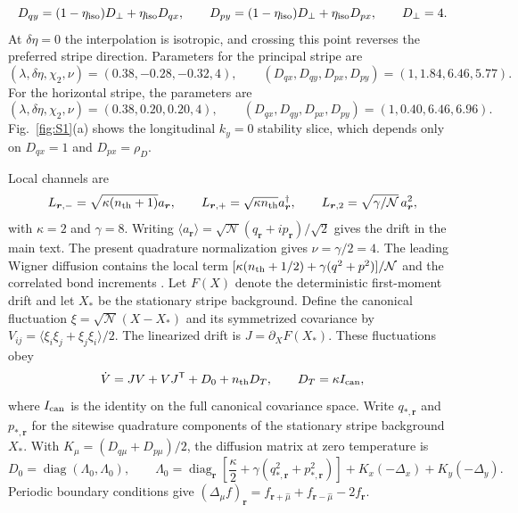\documentclass[aps,prl,twocolumn,superscriptaddress,nofootinbib,floatfix]{revtex4-2}
\newcommand{\cN}{\mathcal N}
\begin{document}
\begin{equation}
 D_{qy}=(1-\eta_{\rm iso})D_\perp+\eta_{\rm iso}D_{qx},
 \qquad
 D_{py}=(1-\eta_{\rm iso})D_\perp+\eta_{\rm iso}D_{px},
 \qquad D_\perp=4.
 \label{eq:transportMapS}
\end{equation}
At $\delta\eta=0$ the interpolation is isotropic, and crossing this point reverses the preferred stripe direction. Parameters for the principal stripe are
\[
 (\lambda,\delta\eta,\chi_2,\nu)=(0.38,-0.28,-0.32,4),
 \qquad (D_{qx},D_{qy},D_{px},D_{py})=(1,1.84,6.46,5.77).
\]
For the horizontal stripe, the parameters are
\[
 (\lambda,\delta\eta,\chi_2,\nu)=(0.38,0.20,0.20,4),
 \qquad (D_{qx},D_{qy},D_{px},D_{py})=(1,0.40,6.46,6.96).
\]
Fig.~\ref{fig:S1}(a) shows the longitudinal $k_y=0$ stability slice, which depends only on $D_{qx}=1$ and $D_{px}=\rho_D$.

Local channels are
\begin{equation}
 L_{\bm r,-}=\sqrt{\kappa(n_{\rm th}+1)}a_{\bm r},
 \qquad
 L_{\bm r,+}=\sqrt{\kappa n_{\rm th}}a_{\bm r}^\dagger,
 \qquad
 L_{\bm r,2}=\sqrt{\gamma/\cN}\,a_{\bm r}^2,
 \label{eq:localjumpsS}
\end{equation}
with $\kappa=2$ and $\gamma=8$. Writing $\langle a_{\bm r}\rangle=\sqrt{\cN}(q_{\bm r}+ip_{\bm r})/\sqrt2$ gives the drift in the main text. The present quadrature normalization gives $\nu=\gamma/2=4$. The leading Wigner diffusion contains the local term $[\kappa(n_{\rm th}+1/2)+\gamma(q^2+p^2)]/\cN$ and the correlated bond increments \cite{GardinerZoller2004,VanKampen2007}. Let $F(X)$ denote the deterministic first-moment drift and let $X_*$ be the stationary stripe background. Define the canonical fluctuation $\xi=\sqrt{\cN}(X-X_*)$ and its symmetrized covariance by $V_{ij}=\langle\xi_i\xi_j+\xi_j\xi_i\rangle/2$. The linearized drift is $J=\partial_XF(X_*)$. These fluctuations obey
\begin{equation}
 \dot V=JV+VJ^{\mathsf T}+D_0+n_{\rm th}D_T,
 \qquad D_T=\kappa I_{\rm can},
 \label{eq:LyapunovS}
\end{equation}
where $I_{\rm can}$ is the identity on the full canonical covariance space. Write $q_{*,\bm r}$ and $p_{*,\bm r}$ for the sitewise quadrature components of the stationary stripe background $X_*$. With $K_\mu=(D_{q\mu}+D_{p\mu})/2$, the diffusion matrix at zero temperature is
\begin{equation}
 D_0=\operatorname{diag}(\Lambda_0,\Lambda_0),
 \qquad
 \Lambda_0=\operatorname{diag}_{\bm r}\!\left[\frac{\kappa}{2}+\gamma(q_{*,\bm r}^{2}+p_{*,\bm r}^{2})\right]+K_x(-\Delta_x)+K_y(-\Delta_y).
 \label{eq:D0S}
\end{equation}
Periodic boundary conditions give $(\Delta_\mu f)_{\bm r}=f_{\bm r+\hat\mu}+f_{\bm r-\hat\mu}-2f_{\bm r}.$
\end{document}
